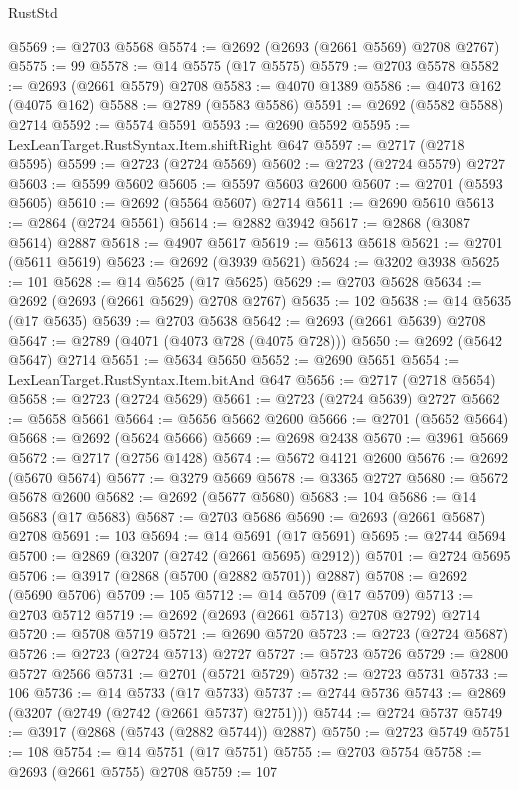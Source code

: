 \begin{lexlean}{RustStd}
\begin{coremodule}
@5569 := @2703 @5568
@5574 := @2692 (@2693 (@2661 @5569) @2708 @2767)
@5575 := 99
@5578 := @14 @5575 (@17 @5575)
@5579 := @2703 @5578
@5582 := @2693 (@2661 @5579) @2708
@5583 := @4070 @1389
@5586 := @4073 @162 (@4075 @162)
@5588 := @2789 (@5583 @5586)
@5591 := @2692 (@5582 @5588) @2714
@5592 := @5574 @5591
@5593 := @2690 @5592
@5595 := LexLeanTarget.RustSyntax.Item.shiftRight @647
@5597 := @2717 (@2718 @5595)
@5599 := @2723 (@2724 @5569)
@5602 := @2723 (@2724 @5579) @2727
@5603 := @5599 @5602
@5605 := @5597 @5603 @2600
@5607 := @2701 (@5593 @5605)
@5610 := @2692 (@5564 @5607) @2714
@5611 := @2690 @5610
@5613 := @2864 (@2724 @5561)
@5614 := @2882 @3942
@5617 := @2868 (@3087 @5614) @2887
@5618 := @4907 @5617
@5619 := @5613 @5618
@5621 := @2701 (@5611 @5619)
@5623 := @2692 (@3939 @5621)
@5624 := @3202 @3938
@5625 := 101
@5628 := @14 @5625 (@17 @5625)
@5629 := @2703 @5628
@5634 := @2692 (@2693 (@2661 @5629) @2708 @2767)
@5635 := 102
@5638 := @14 @5635 (@17 @5635)
@5639 := @2703 @5638
@5642 := @2693 (@2661 @5639) @2708
@5647 := @2789 (@4071 (@4073 @728 (@4075 @728)))
@5650 := @2692 (@5642 @5647) @2714
@5651 := @5634 @5650
@5652 := @2690 @5651
@5654 := LexLeanTarget.RustSyntax.Item.bitAnd @647
@5656 := @2717 (@2718 @5654)
@5658 := @2723 (@2724 @5629)
@5661 := @2723 (@2724 @5639) @2727
@5662 := @5658 @5661
@5664 := @5656 @5662 @2600
@5666 := @2701 (@5652 @5664)
@5668 := @2692 (@5624 @5666)
@5669 := @2698 @2438
@5670 := @3961 @5669
@5672 := @2717 (@2756 @1428)
@5674 := @5672 @4121 @2600
@5676 := @2692 (@5670 @5674)
@5677 := @3279 @5669
@5678 := @3365 @2727
@5680 := @5672 @5678 @2600
@5682 := @2692 (@5677 @5680)
@5683 := 104
@5686 := @14 @5683 (@17 @5683)
@5687 := @2703 @5686
@5690 := @2693 (@2661 @5687) @2708
@5691 := 103
@5694 := @14 @5691 (@17 @5691)
@5695 := @2744 @5694
@5700 := @2869 (@3207 (@2742 (@2661 @5695) @2912))
@5701 := @2724 @5695
@5706 := @3917 (@2868 (@5700 (@2882 @5701)) @2887)
@5708 := @2692 (@5690 @5706)
@5709 := 105
@5712 := @14 @5709 (@17 @5709)
@5713 := @2703 @5712
@5719 := @2692 (@2693 (@2661 @5713) @2708 @2792) @2714
@5720 := @5708 @5719
@5721 := @2690 @5720
@5723 := @2723 (@2724 @5687)
@5726 := @2723 (@2724 @5713) @2727
@5727 := @5723 @5726
@5729 := @2800 @5727 @2566
@5731 := @2701 (@5721 @5729)
@5732 := @2723 @5731
@5733 := 106
@5736 := @14 @5733 (@17 @5733)
@5737 := @2744 @5736
@5743 := @2869 (@3207 (@2749 (@2742 (@2661 @5737) @2751)))
@5744 := @2724 @5737
@5749 := @3917 (@2868 (@5743 (@2882 @5744)) @2887)
@5750 := @2723 @5749
@5751 := 108
@5754 := @14 @5751 (@17 @5751)
@5755 := @2703 @5754
@5758 := @2693 (@2661 @5755) @2708
@5759 := 107

\end{coremodule}
\end{lexlean}
